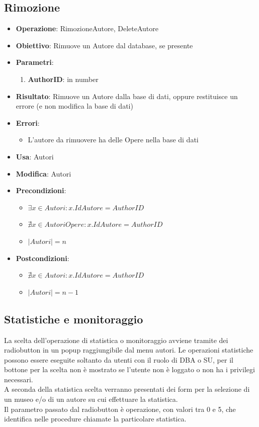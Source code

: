 \subsection{Rimozione}
\begin{itemize}
	\item \textbf{Operazione}: RimozioneAutore, DeleteAutore
	\item \textbf{Obiettivo}: Rimuove un Autore dal database, se presente
	\item \textbf{Parametri}:
	\begin{enumerate}
		\item \textbf{AuthorID}: in number
	\end{enumerate}
	\item \textbf{Risultato}: Rimuove un Autore dalla base di dati, oppure restituisce un errore (e non modifica la base di dati)
	\item \textbf{Errori}: 
	\begin{itemize}
		\item L'autore da rimuovere ha delle Opere nella base di dati
	\end{itemize}
	\item \textbf{Usa}: Autori
	\item \textbf{Modifica}: Autori
	\item \textbf{Precondizioni}:
	\begin{itemize}
		\item $\exists x \in Autori : x.IdAutore = AuthorID$
		\item $\nexists x \in AutoriOpere : x.IdAutore = AuthorID$
		\item $|Autori| = n$
	\end{itemize}
	\item \textbf{Postcondizioni}:
	\begin{itemize}
		\item $\nexists x \in Autori : x.IdAutore = AuthorID$
		\item $|Autori| = n - 1$
	\end{itemize}
\end{itemize}


\subsection{Statistiche e monitoraggio}
La scelta dell'operazione di statistica o monitoraggio avviene tramite dei radiobutton in un popup raggiungibile dal menu autori.
Le operazioni statistiche possono essere eseguite soltanto da utenti con il ruolo di DBA o SU, per il bottone per la scelta non è mostrato
se l'utente non è loggato o non ha i privilegi necessari.\\
A seconda della statistica scelta verranno presentati dei form per la selezione di un museo e/o di un autore su cui effettuare la statistica.\\
Il parametro passato dal radiobutton è operazione, con valori tra 0 e 5, che identifica nelle procedure chiamate la particolare statistica.\\

